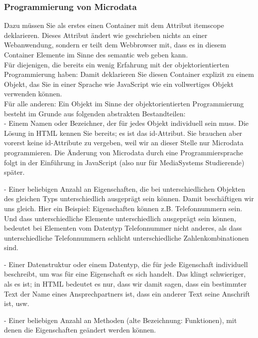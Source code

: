 \subsubsection{Programmierung von Microdata}

Dazu müssen Sie als erstes einen Container mit dem Attribut itemscope deklarieren. Dieses Attribut ändert wie geschrieben nichts an einer Webanwendung, sondern er teilt dem Webbrowser mit, dass es in diesem Container Elemente im Sinne des semantic web geben kann.\\

Für diejenigen, die bereits ein wenig Erfahrung mit der objektorientierten Programmierung haben: Damit deklarieren Sie diesen Container explizit zu einem Objekt, das Sie in einer Sprache wie JavaScript wie ein vollwertiges Objekt verwenden können.\\

Für alle anderen: Ein Objekt im Sinne der objektorientierten Programmierung besteht im Grunde aus folgenden abstrakten Bestandteilen:\\

-	Einem Namen oder Bezeichner, der für jedes Objekt individuell sein muss.
Die Lösung in HTML kennen Sie bereits; es ist das id-Attribut. Sie brauchen aber vorerst keine id-Attribute zu vergeben, weil wir an dieser Stelle nur Microdata programmieren. Die Änderung von Microdata durch eine Programmiersprache folgt in der Einführung in JavaScript (also nur für MediaSystems Studierende) später.

-	Einer beliebigen Anzahl an Eigenschaften, die bei unterschiedlichen Objekten des gleichen Typs unterschiedlich ausgeprägt sein können.
Damit beschäftigen wir uns gleich. Hier ein Beispiel: Eigenschaften können z.B. Telefonnummern sein. Und dass unterschiedliche Elemente unterschiedlich ausgeprägt sein können, bedeutet bei Elementen vom Datentyp Telefonnummer nicht anderes, als dass unterschiedliche Telefonnummern schlicht unterschiedliche Zahlenkombinationen sind.

-	Einer Datenstruktur oder einem Datentyp, die für jede Eigenschaft individuell beschreibt, um was für eine Eigenschaft es sich handelt.
Das klingt schwieriger, als es ist; in HTML bedeutet es nur, dass wir damit sagen, dass ein bestimmter Text der Name eines Ansprechpartners ist, dass ein anderer Text seine Anschrift ist, usw.

-	Einer beliebigen Anzahl an Methoden (alte Bezeichnung: Funktionen), mit denen die Eigenschaften geändert werden können.

